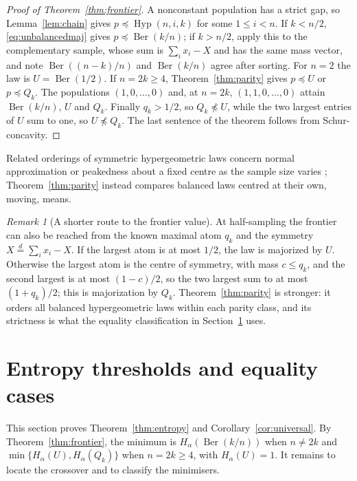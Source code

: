 \documentclass[11pt]{article}
\theoremstyle{remark}
\newtheorem{remark}[theorem]{Remark}
\newcommand{\Hyp}{\operatorname{Hyp}}
\newcommand{\Ber}{\operatorname{Ber}}
\begin{document}
\begin{proof}[Proof of Theorem~\ref{thm:frontier}]
A nonconstant population has a strict gap, so Lemma~\ref{lem:chain} gives
\(p\preceq\Hyp(n,i,k)\) for some \(1\le i<n\). If \(k<n/2\),
\eqref{eq:unbalancedmaj} gives \(p\preceq\Ber(k/n)\); if \(k>n/2\), apply this
to the complementary sample, whose sum is \(\sum_ix_i-X\) and has the same
mass vector, and note \(\Ber((n-k)/n)\) and \(\Ber(k/n)\) agree after sorting.
For \(n=2\) the law is \(U=\Ber(1/2)\). If \(n=2k\ge4\),
Theorem~\ref{thm:parity} gives \(p\preceq U\) or \(p\preceq Q_k\). The
populations \((1,0,\ldots,0)\) and, at \(n=2k\), \((1,1,0,\ldots,0)\) attain
\(\Ber(k/n)\), \(U\) and \(Q_k\). Finally \(q_k>1/2\), so \(Q_k\not\preceq U\),
while the two largest entries of \(U\) sum to one, so \(U\not\preceq Q_k\).
The last sentence of the theorem follows from Schur-concavity.
\end{proof}

Related orderings of symmetric hypergeometric laws concern normal
approximation \cite{MSch} or peakedness about a fixed centre as the sample size
varies \cite{Levin}; Theorem~\ref{thm:parity} instead compares balanced laws
centred at their own, moving, means.

\begin{remark}[A shorter route to the frontier value]\label{rem:shortroute}
At half-sampling the frontier can also be reached from the known maximal atom
\(q_k\) \cite[Section~5]{MVV} and the symmetry \(X\overset d=\sum_ix_i-X\).
If the largest atom is at most \(1/2\), the law is majorized by \(U\).
Otherwise the largest atom is the centre of symmetry, with mass
\(c\le q_k\), and the second largest is at most \((1-c)/2\), so the two
largest sum to at most \((1+q_k)/2\); this is majorization by \(Q_k\).
Theorem~\ref{thm:parity} is stronger: it orders all balanced hypergeometric
laws within each parity class, and its strictness is what the equality
classification in Section~\ref{sec:entropy} uses.
\end{remark}

\section{Entropy thresholds and equality cases}\label{sec:entropy}

This section proves Theorem~\ref{thm:entropy} and
Corollary~\ref{cor:universal}. By Theorem~\ref{thm:frontier}, the minimum is
\(H_\alpha(\Ber(k/n))\) when \(n\ne2k\) and \(\min\{H_\alpha(U),H_\alpha(Q_k)\}\)
when \(n=2k\ge4\), with \(H_\alpha(U)=1\). It remains to locate the crossover
and to classify the minimisers.
\end{document}

